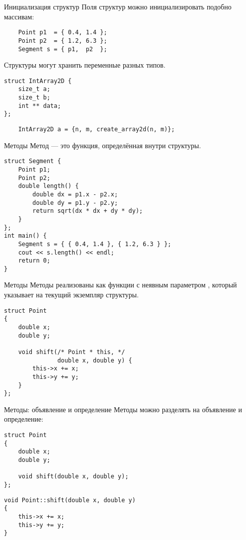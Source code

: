 \documentclass{beamer}
\begin{document}
\begin{frame}[fragile]{Инициализация структур}
Поля структур можно инициализировать подобно массивам:
\begin{lstlisting}
    Point p1  = { 0.4, 1.4 };
    Point p2  = { 1.2, 6.3 };
    Segment s = { p1,  p2  };
\end{lstlisting}
Структуры могут хранить переменные разных типов.
\begin{lstlisting}
struct IntArray2D {
    size_t a;
    size_t b;
    int ** data;
};
\end{lstlisting}
\begin{lstlisting}
    IntArray2D a = {n, m, create_array2d(n, m)};
\end{lstlisting}
\end{frame}

\begin{frame}[fragile]{Методы}
    Метод — это функция, определённая внутри структуры.
\small
\begin{lstlisting}
struct Segment {
    Point p1;
    Point p2;
    double length() {
        double dx = p1.x - p2.x;
        double dy = p1.y - p2.y;
        return sqrt(dx * dx + dy * dy);
    }
};
int main() {
    Segment s = { { 0.4, 1.4 }, { 1.2, 6.3 } };
    cout << s.length() << endl;
    return 0;
}
\end{lstlisting}
\end{frame}                            

\begin{frame}[fragile]{Методы}
    Методы реализованы как функции с неявным параметром ,
    который указывает на текущий экземпляр структуры.
\small
\begin{lstlisting}
struct Point 
{
    double x;
    double y;

    void shift(/* Point * this, */
               double x, double y) {
        this->x += x;
        this->y += y;        
    }
};
\end{lstlisting}
\end{frame}                            

\begin{frame}[fragile]{Методы: объявление и определение}
    Методы можно разделять на объявление и определение:
\begin{lstlisting}
struct Point 
{
    double x;
    double y;

    void shift(double x, double y);
};
\end{lstlisting}

\begin{lstlisting}
void Point::shift(double x, double y) 
{
    this->x += x;
    this->y += y;        
}
\end{lstlisting}
\end{frame}                            
\end{document}
